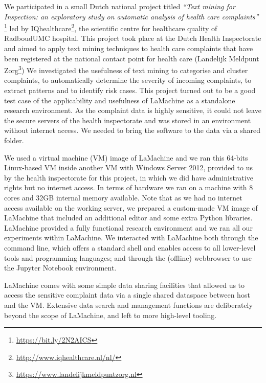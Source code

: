 \documentclass[a4paper,11pt]{article}
\begin{document}
We participated in a small Dutch national project titled \emph{``Text mining for Inspection: an exploratory study on
automatic analysis of health care complaints''} \footnote{\url{https://bit.ly/2N2AICS}} %
led by IQhealthcare\footnote{\url{http://www.iqhealthcare.nl/nl/}}, the scientific centre for healthcare quality of RadboudUMC hospital.
This project took place at the Dutch Health Inspectorate and aimed to apply text mining techniques to health care
complaints that have been registered at the national contact point for health care (Landelijk Meldpunt
Zorg\footnote{\url{https://www.landelijkmeldpuntzorg.nl}})
We investigated the usefulness of text mining to categorise and cluster complaints, to automatically determine the
severity of incoming complaints, to extract patterns  and to identify risk cases. This project turned out to be a good
test case of the applicability and usefulness of LaMachine as a standalone research environment.
As the complaint data is highly sensitive, it could not leave the secure servers of the health inspectorate and was
stored in an environment without internet access. We needed to bring the software to the data via a shared folder.

We used a virtual machine (VM) image of LaMachine and we ran this 64-bits Linux-based VM inside another
VM with Windows Server 2012, provided to us by the health inspectorate for this project, in which we did have administrative
rights but no internet access. In terms of hardware we ran on a machine with 8 cores and  32GB internal memory available. Note that as we had no internet access available on the working server, we prepared a custom-made VM image of LaMachine that included an additional editor and some extra Python libraries.
LaMachine provided a fully functional research environment and we ran all our experiments within LaMachine. We interacted with LaMachine both through the command line, which offers a standard
shell and enables access to all lower-level tools and programming languages; and through the (offline) webbrowser to use
the Jupyter Notebook environment.

LaMachine comes with some simple data sharing facilities that allowed us to access the sensitive complaint data via a
single shared dataspace between host and the VM. Extensive data search and management functions are deliberately beyond the scope of LaMachine, and left to more high-level tooling.
\end{document}
